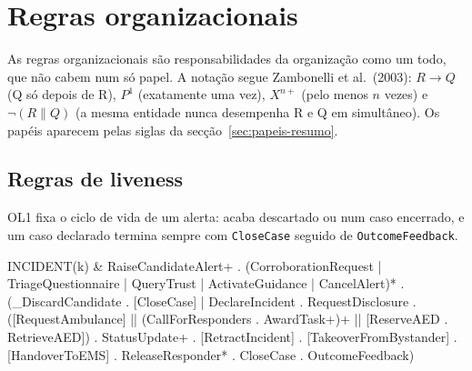 \documentclass[10pt,a4paper]{article}
\makeatletter
\newenvironment{liveness}
  {\par\smallskip\noindent\small
   \tabularx{\linewidth}{@{\hspace{1em}}>{\ttfamily}l@{\hspace{0.5em}=\hspace{0.5em}}>{\ttfamily\raggedright\arraybackslash}X@{}}}
  {\endtabularx\par\smallskip}
\newcommand{\id}[1]{\texttt{#1}}
\makeatother
\begin{document}
\section{Regras organizacionais}\label{sec:regras}

As regras organizacionais são responsabilidades da organização como um todo, que não cabem num só papel. A notação segue Zambonelli et al.\ (2003): $R \rightarrow Q$ (Q só depois de R), $P^{1}$ (exatamente uma vez), $X^{n+}$ (pelo menos $n$ vezes) e $\neg(R \parallel Q)$ (a mesma entidade nunca desempenha R e Q em simultâneo). Os papéis aparecem pelas siglas da secção~\ref{sec:papeis-resumo}.

\subsection{Regras de liveness}\label{sec:liveness}

OL1 fixa o ciclo de vida de um alerta: acaba descartado ou num caso encerrado, e um caso declarado termina sempre com \id{CloseCase} seguido de \id{OutcomeFeedback}.
\begin{liveness}
INCIDENT(k) & RaiseCandidateAlert+ . (CorroborationRequest | TriageQuestionnaire | QueryTrust | ActivateGuidance | CancelAlert)* . (\_DiscardCandidate . [CloseCase] | DeclareIncident . RequestDisclosure . ([RequestAmbulance] || (CallForResponders . AwardTask+)+ || [ReserveAED . RetrieveAED]) . StatusUpdate+ . [RetractIncident] . [TakeoverFromBystander] . [HandoverToEMS] . ReleaseResponder* . CloseCase . OutcomeFeedback) \\
\end{liveness}
\end{document}
